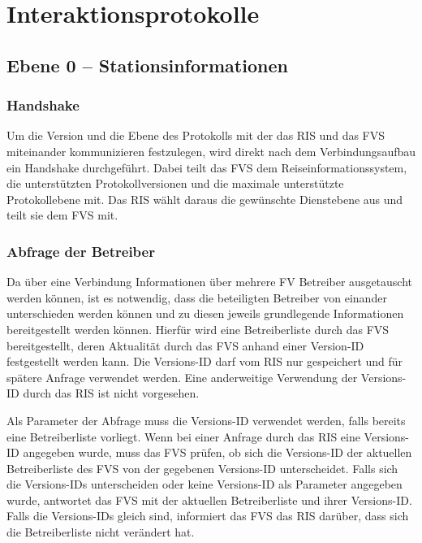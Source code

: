 \chapter{Interaktionsprotokolle}
\label{sec:Interaktionsprotokolle}

\section{Ebene 0 -- Stationsinformationen}

\subsection{Handshake}
Um die Version und die Ebene des Protokolls mit der das RIS und das FVS miteinander kommunizieren festzulegen, wird direkt nach dem Verbindungsaufbau ein Handshake durchgeführt. Dabei teilt das FVS dem Reiseinformationssystem, die unterstützten Protokollversionen und die maximale unterstützte Protokollebene mit. Das RIS wählt daraus die gewünschte Dienstebene aus und teilt sie dem FVS mit.

\subsection{Abfrage der Betreiber}
Da über eine Verbindung Informationen über mehrere FV Betreiber ausgetauscht werden können, ist es notwendig, dass die beteiligten Betreiber von einander unterschieden werden können und zu diesen jeweils grundlegende Informationen bereitgestellt werden können. Hierfür wird eine Betreiberliste durch das FVS bereitgestellt, deren Aktualität durch das FVS anhand einer Version-ID festgestellt werden kann. Die Versions-ID darf vom RIS nur gespeichert und für spätere Anfrage verwendet werden. Eine anderweitige Verwendung der Versions-ID durch das RIS ist nicht vorgesehen. 

Als Parameter der Abfrage muss die Versions-ID verwendet werden, falls bereits eine Betreiberliste vorliegt.
Wenn bei einer Anfrage durch das RIS eine Versions-ID angegeben wurde, muss das FVS prüfen, ob sich die Versions-ID der aktuellen Betreiberliste des FVS von der gegebenen Versions-ID unterscheidet. Falls sich die Versions-IDs unterscheiden oder keine Versions-ID als Parameter angegeben wurde, antwortet das FVS mit der aktuellen Betreiberliste und ihrer Versions-ID. Falls die Versions-IDs gleich sind, informiert das FVS das RIS darüber, dass sich die Betreiberliste nicht verändert hat.

